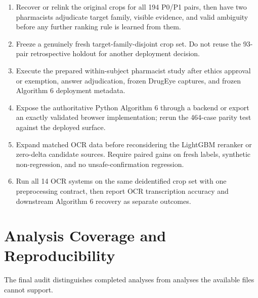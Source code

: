 \documentclass[11pt,a4paper]{article}
\begin{document}
\begin{enumerate}
  \item Recover or relink the original crops for all 194 P0/P1 pairs, then have
        two pharmacists adjudicate target family, visible evidence, and valid
        ambiguity before any further ranking rule is learned from them.
  \item Freeze a genuinely fresh target-family-disjoint crop set. Do not reuse
        the 93-pair retrospective holdout for another deployment decision.
  \item Execute the prepared within-subject pharmacist study after ethics
        approval or exemption, answer adjudication, frozen DrugEye captures,
        and frozen Algorithm 6 deployment metadata.
  \item Expose the authoritative Python Algorithm 6 through a backend or export
        an exactly validated browser implementation; rerun the 464-case parity
        test against the deployed surface.
  \item Expand matched OCR data before reconsidering the LightGBM reranker or
        zero-delta candidate sources. Require paired gains on fresh labels,
        synthetic non-regression, and no unsafe-confirmation regression.
  \item Run all 14 OCR systems on the same deidentified crop set with one
        preprocessing contract, then report OCR transcription accuracy and
        downstream Algorithm 6 recovery as separate outcomes.
\end{enumerate}

\section{Analysis Coverage and Reproducibility}

The final audit distinguishes completed analyses from analyses the available
files cannot support.
\end{document}
